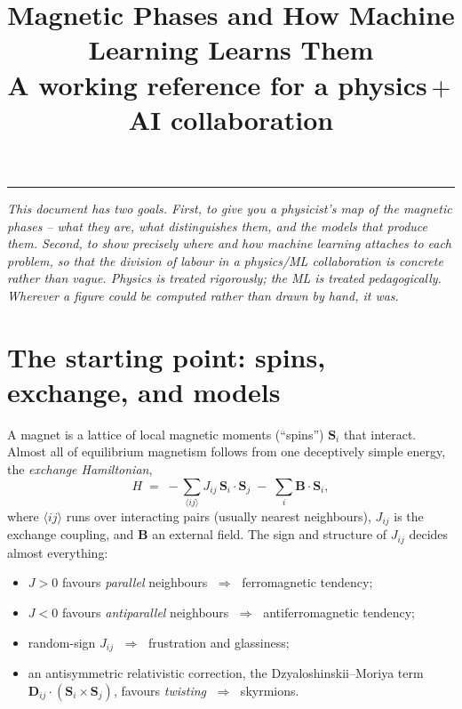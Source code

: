 \documentclass[11pt]{article}
\title{\vspace{-1.2cm}\textbf{Magnetic Phases and How Machine Learning Learns Them}\\[2pt]
\large A working reference for a physics\,$+$\,AI collaboration}
\author{}
\date{}
\newcommand{\vS}{\mathbf{S}}
\begin{document}
\maketitle
\vspace{-1.4cm}
\begin{center}\rule{0.6\textwidth}{0.4pt}\end{center}

\noindent\textit{This document has two goals. First, to give you a physicist's map of
the magnetic phases -- what they are, what distinguishes them, and the models that
produce them. Second, to show precisely where and how machine learning attaches to
each problem, so that the division of labour in a physics/ML collaboration is concrete
rather than vague. Physics is treated rigorously; the ML is treated pedagogically.
Wherever a figure could be computed rather than drawn by hand, it was.}

\tableofcontents
\vspace{4mm}

\section{The starting point: spins, exchange, and models}
A magnet is a lattice of local magnetic moments (``spins'') $\vS_i$ that interact.
Almost all of equilibrium magnetism follows from one deceptively simple energy, the
\emph{exchange Hamiltonian},
\begin{equation}
H \;=\; -\sum_{\langle ij\rangle} J_{ij}\,\vS_i\!\cdot\!\vS_j \;-\; \sum_i \mathbf{B}\!\cdot\!\vS_i ,
\label{eq:exchange}
\end{equation}
where $\langle ij\rangle$ runs over interacting pairs (usually nearest neighbours),
$J_{ij}$ is the exchange coupling, and $\mathbf{B}$ an external field. The sign and
structure of $J_{ij}$ decides almost everything:
\begin{itemize}
\item $J>0$ favours \emph{parallel} neighbours $\;\Rightarrow\;$ ferromagnetic tendency;
\item $J<0$ favours \emph{antiparallel} neighbours $\;\Rightarrow\;$ antiferromagnetic tendency;
\item random-sign $J_{ij}$ $\;\Rightarrow\;$ frustration and glassiness;
\item an antisymmetric relativistic correction, the Dzyaloshinskii--Moriya term
$\mathbf{D}_{ij}\!\cdot(\vS_i\times\vS_j)$, favours \emph{twisting} $\;\Rightarrow\;$ skyrmions.
\end{itemize}
\end{document}

